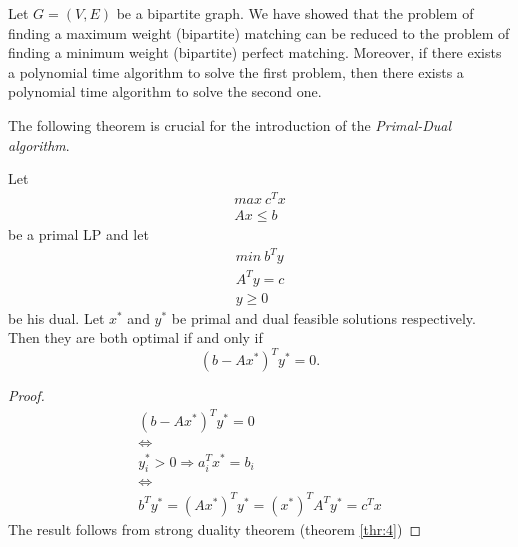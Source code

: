 Let $G=(V,E)$ be a bipartite graph. We have showed that the
problem of finding a maximum weight (bipartite) matching can
be reduced to the problem of finding a minimum weight 
(bipartite) perfect matching. Moreover, if there exists a
polynomial time algorithm to solve the first problem, then 
there exists a polynomial time algorithm to solve the second one.

The following theorem is crucial for the introduction of the
\emph{Primal-Dual algorithm}.

\begin{theorem}
\label{thr:compslack}
   Let 
   \begin{displaymath}
      \begin{array}{c}
         max \ c^T x \\
         Ax \leq b
      \end{array}
   \end{displaymath}
   be a primal LP and let 
   \begin{displaymath}
      \begin{array}{c}
         min \ b^T y \\
         A^T y = c \\
         y \geq 0
      \end{array}
   \end{displaymath}
   be his dual. Let $x^*$ and $y^*$ be primal and dual feasible
   solutions respectively. Then they are both optimal if and
   only if 
   \begin{displaymath}
      (b - A x^*)^T y^* = 0.
   \end{displaymath}
\end{theorem}

\begin{proof}
   \begin{displaymath}
      \begin{array}{c}
         (b - A x^*)^T y^* = 0 \\
         \Leftrightarrow \\
         y^*_i > 0 \Rightarrow a^T_i x^* = b_i \\
         \Leftrightarrow \\
         b^T y^* = (A x^*)^T y^* = (x^*)^T A^T y^* = c^T x
      \end{array}
   \end{displaymath}
   The result follows from strong duality theorem 
   (theorem \ref{thr:4})
\end{proof}

